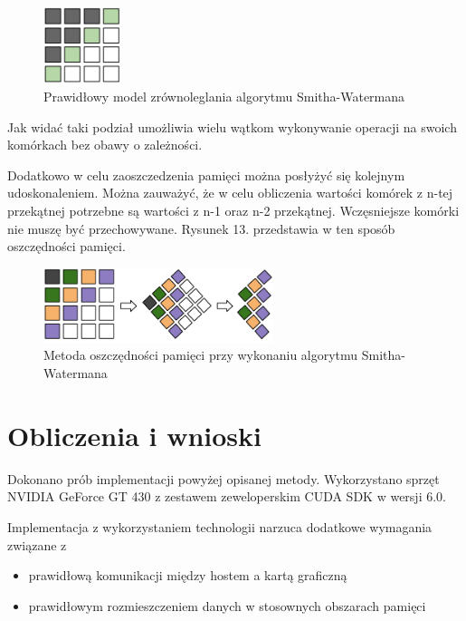 \documentclass[a4paper,12pt]{article}
\newenvironment{lista}{
\begin{itemize}
  \setlength{\itemsep}{1pt}
  \setlength{\parskip}{0pt}
  \setlength{\parsep}{0pt}
}{\end{itemize}}
\begin{document}
\begin{figure}[H]
  \vspace{5pt}
  \centering
  \begin{center}
  \includegraphics[width=0.2\textwidth]{images/DobryModelZrownoleglenia.png}
  \end{center}
  \caption{Prawidłowy model zrównoleglania algorytmu Smitha-Watermana}
 \end{figure}

Jak widać taki podział umożliwia wielu wątkom wykonywanie operacji na swoich komórkach bez obawy o zależności. 

Dodatkowo w celu zaoszczedzenia pamięci można posłyżyć się kolejnym udoskonaleniem. Można zauważyć, że w celu obliczenia wartości komórek z n-tej przekątnej potrzebne są wartości z n-1 oraz n-2 przekątnej. Wczęsniejsze komórki nie muszę być przechowywane. Rysunek 13. przedstawia w ten sposób oszczędności pamięci.

\begin{figure}[H]
  \vspace{5pt}
  \centering
  \begin{center}
  \includegraphics[width=0.6\textwidth]{images/OszczednoscPamieciPrzyZrownolegleniu.png}
  \end{center}
  \caption{Metoda oszczędności pamięci przy wykonaniu algorytmu Smitha-Watermana}
 \end{figure}


\section*{Obliczenia i wnioski}
Dokonano prób implementacji powyżej opisanej metody. Wykorzystano sprzęt NVIDIA GeForce GT 430 z zestawem zeweloperskim CUDA SDK w wersji 6.0. 

Implementacja z wykorzystaniem technologii narzuca dodatkowe wymagania związane z
\begin{lista}
\item prawidłową komunikacji między hostem a kartą graficzną
\item prawidłowym rozmieszczeniem danych w stosownych obszarach pamięci
\end{lista} 
\end{document}
